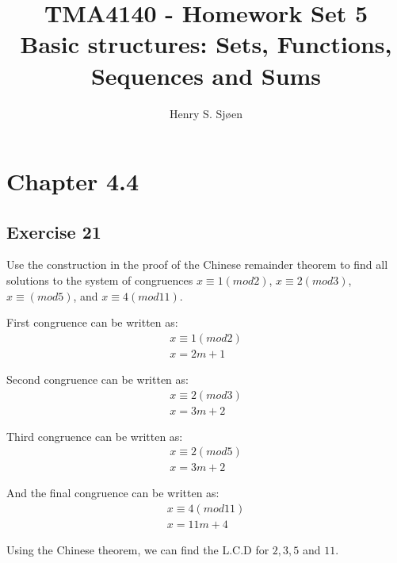 \documentclass[12pt]{article}
\author{Henry S. Sjøen}
\title{
  \textbf{TMA4140 - Homework Set 5}\\
  Basic structures: Sets, Functions, Sequences and Sums\\
    \color{darkred}{\textbf{RETTES}}
  }
\begin{document}
    \maketitle
    \thispagestyle{empty}
    \pagebreak
    \tableofcontents
    \pagebreak
    
    \section{Chapter 4.4}
    \subsection{Exercise 21}
    Use the construction in the proof of the Chinese remainder theorem to find all solutions to the system of congruences $x \equiv 1(mod 2)$, $x \equiv 2 (mod 3)$, $x \equiv (mod 5)$, and $x \equiv 4 (mod 11)$.
  
    First congruence can be written as:
    \begin{equation}
      \begin{split}
        x \equiv  1(mod2)\\
        x = 2m + 1
      \end{split}
    \end{equation}
    
    Second congruence can be written as:
    \begin{equation}
      \begin{split}
        x \equiv  2(mod3)\\
        x = 3m + 2
      \end{split}
    \end{equation}
    
    Third congruence can be written as:
    \begin{equation}
      \begin{split}
      x \equiv  2(mod5)\\
      x = 3m + 2
      \end{split}
    \end{equation}

    And the final congruence can be written as:
    \begin{equation}
      \begin{split}
        x \equiv 4(mod11)\\
        x = 11m+4
      \end{split}
    \end{equation}

    Using the Chinese theorem, we can find the L.C.D for $2,3,5$ and $11$.
  
\end{document}

